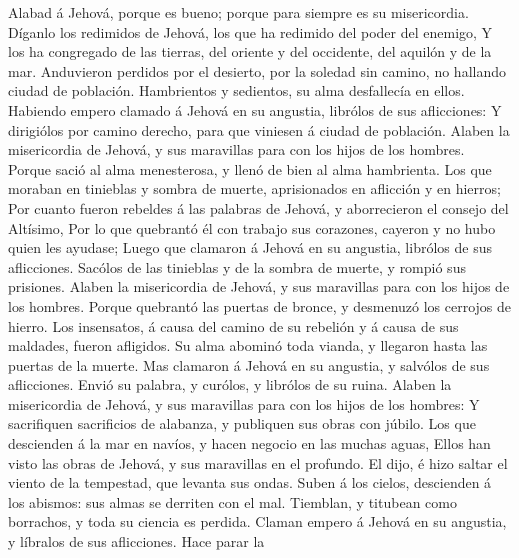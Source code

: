  Alabad á Jehová, porque es bueno; porque para siempre es
su misericordia.  Díganlo los redimidos de Jehová, los que
ha redimido del poder del enemigo,  Y los ha congregado de
las tierras, del oriente y del occidente, del aquilón y de la mar.
 Anduvieron perdidos por el desierto, por la soledad sin
camino, no hallando ciudad de población.  Hambrientos y
sedientos, su alma desfallecía en ellos.  Habiendo empero
clamado á Jehová en su angustia, librólos de sus aflicciones:
 Y dirigiólos por camino derecho, para que viniesen á
ciudad de población.  Alaben la misericordia de Jehová, y
sus maravillas para con los hijos de los hombres.  Porque
sació al alma menesterosa, y llenó de bien al alma hambrienta.
 Los que moraban en tinieblas y sombra de muerte,
aprisionados en aflicción y en hierros;  Por cuanto
fueron rebeldes á las palabras de Jehová, y aborrecieron el consejo del
Altísimo,  Por lo que quebrantó él con trabajo sus
corazones, cayeron y no hubo quien les ayudase;  Luego
que clamaron á Jehová en su angustia, librólos de sus aflicciones.
 Sacólos de las tinieblas y de la sombra de muerte, y
rompió sus prisiones.  Alaben la misericordia de Jehová,
y sus maravillas para con los hijos de los hombres. 
Porque quebrantó las puertas de bronce, y desmenuzó los cerrojos de
hierro.  Los insensatos, á causa del camino de su
rebelión y á causa de sus maldades, fueron afligidos.  Su
alma abominó toda vianda, y llegaron hasta las puertas de la muerte.
 Mas clamaron á Jehová en su angustia, y salvólos de sus
aflicciones.  Envió su palabra, y curólos, y librólos de
su ruina.  Alaben la misericordia de Jehová, y sus
maravillas para con los hijos de los hombres:  Y
sacrifiquen sacrificios de alabanza, y publiquen sus obras con júbilo.
 Los que descienden á la mar en navíos, y hacen negocio
en las muchas aguas,  Ellos han visto las obras de
Jehová, y sus maravillas en el profundo.  El dijo, é hizo
saltar el viento de la tempestad, que levanta sus ondas. 
Suben á los cielos, descienden á los abismos: sus almas se derriten con
el mal.  Tiemblan, y titubean como borrachos, y toda su
ciencia es perdida.  Claman empero á Jehová en su
angustia, y líbralos de sus aflicciones.  Hace parar la
